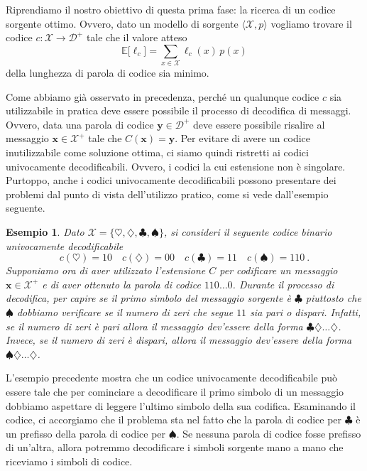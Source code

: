 \documentclass[11pt]{article}
\newtheorem{example}[theorem]{Esempio}
\newcommand{\bx}{ \boldsymbol{x} }
\newcommand{\by}{ \boldsymbol{y} }
\newcommand{\scD}{\mathcal{D}}
\newcommand{\scX}{\mathcal{X}}
\newcommand{\field}[1]{\mathbb{#1}}
\newcommand{\E}{\field{E}}
\begin{document}
\begin{center}
\end{center}

\bigskip

Riprendiamo il nostro obiettivo di questa prima fase: la ricerca di un codice sorgente ottimo. Ovvero, dato un modello di sorgente $\langle\scX,p\rangle$ vogliamo trovare il codice $c : \scX\to\scD^+$ tale che il valore atteso
\begin{equation}
\label{eq:obj}
    \E\bigl[\ell_c\bigr] = \sum_{x\in\scX} \ell_c(x)\,p(x)
\end{equation}
della lunghezza di parola di codice sia minimo.

Come abbiamo già osservato in precedenza, perché un qualunque codice $c$ sia utilizzabile in pratica deve essere possibile il processo di decodifica di messaggi. Ovvero, data una parola di codice $\by\in\scD^+$ deve essere possibile risalire al messaggio $\bx\in\scX^+$ tale che $C(\bx)=\by$. Per evitare di avere un codice inutilizzabile come soluzione ottima, ci siamo quindi ristretti ai codici univocamente decodificabili. Ovvero, i codici la cui estensione non è singolare. Purtoppo, anche i codici univocamente decodificabili possono presentare dei problemi dal punto di vista dell'utilizzo pratico, come si vede dall'esempio seguente.
%
\begin{example}
\label{ex:ud}
Dato $\scX = \{\heartsuit,\diamondsuit,\clubsuit,\spadesuit\}$, si consideri il seguente codice binario univocamente decodificabile
\[
    c(\heartsuit) = 10 \quad c(\diamondsuit) = 00 \quad c(\clubsuit) = 11 \quad c(\spadesuit) = 110~.
\]
Supponiamo ora di aver utilizzato l'estensione $C$ per codificare un messaggio $\bx\in\scX^+$ e di aver ottenuto la parola di codice $110\dots 0$. Durante il processo di decodifica, per capire se il primo simbolo del messaggio sorgente è $\clubsuit$ piuttosto che $\spadesuit$ dobbiamo verificare se il numero di zeri che segue $11$ sia pari o dispari. Infatti, se il numero di zeri è pari allora il messaggio dev'essere della forma $\clubsuit\diamondsuit\dots\diamondsuit$. Invece, se il numero di zeri è dispari, allora il messaggio dev'essere della forma $\spadesuit\diamondsuit\dots\diamondsuit$.
\end{example}
%
L'esempio precedente mostra che un codice univocamente decodificabile può essere tale che per cominciare a decodificare il primo simbolo di un messaggio dobbiamo aspettare di leggere l'ultimo simbolo della sua codifica. Esaminando il codice, ci accorgiamo che il problema sta nel fatto che la parola di codice per $\clubsuit$ è un prefisso della parola di codice per $\spadesuit$. Se nessuna parola di codice fosse prefisso di un'altra, allora potremmo decodificare i simboli sorgente mano a mano che riceviamo i simboli di codice.
\end{document}

